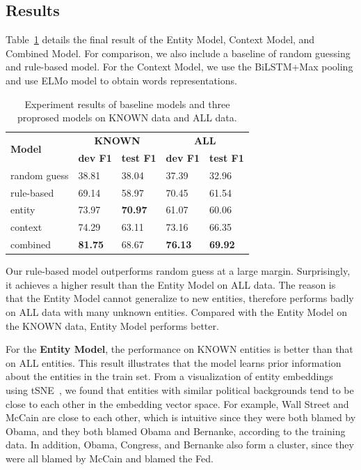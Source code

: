 \documentclass[letterpaper]{article} %
\begin{document}
\subsection{Results}

Table~\ref{table:finalresult} details the final result of the Entity Model, Context Model, and Combined Model. For comparison, we also include a baseline of random guessing and rule-based model. For the Context Model, we use the BiLSTM+Max pooling and use ELMo model to obtain words representations.

\begin{table}[t]
\centering
\begin{tabular}{l | p{1cm} p{1cm} | p{1cm} p{1cm}} 
\hline
\multirow{2}{2pt}{\bf Model} & \multicolumn{2}{c|}{\bf KNOWN}  & \multicolumn{2}{c}{\bf ALL} \\
 & {\bf dev F1 } & {\bf test F1} & {\bf dev F1 } & {\bf test F1 } \\
\hline\hline
random guess & 38.81 & 38.04 & 37.39 & 32.96 \\
\hline
rule-based & 69.14  & 58.97 & 70.45 & 61.54 \\
\hline\hline
entity & 73.97 & {\bf 70.97} & 61.07 & 60.06 \\ 
\hline
context & 74.29  & 63.11 & 73.16 & 66.35 \\
\hline
combined & {\bf 81.75}  & 68.67 & {\bf 76.13}  & {\bf 69.92} \\
\hline
\end{tabular}
\caption{Experiment results of baseline models and three proprosed models on KNOWN data and ALL data.}
\label{table:finalresult}
\end{table}

Our rule-based model outperforms random guess at a large margin. Surprisingly, it achieves a higher result than the Entity Model on ALL data. The reason is that the Entity Model cannot generalize to new entities, therefore performs badly on ALL data with many unknown entities. Compared with the Entity Model on the KNOWN data, Entity Model performs better.

For the \textbf{Entity Model}, the performance on KNOWN entities is better than that on ALL entities. This result illustrates that the model learns prior information about the entities in the train set. From a visualization of entity embeddings using tSNE~\cite{maaten2008visualizing}, we found that entities with similar political backgrounds tend to be close to each other in the embedding vector space. For example, Wall Street and McCain are close to each other, which is intuitive since they were both blamed by Obama, and they both blamed Obama and Bernanke, according to the training data. In addition, Obama, Congress, and Bernanke also form a cluster, since they were all blamed by McCain and blamed the Fed.
\end{document}
